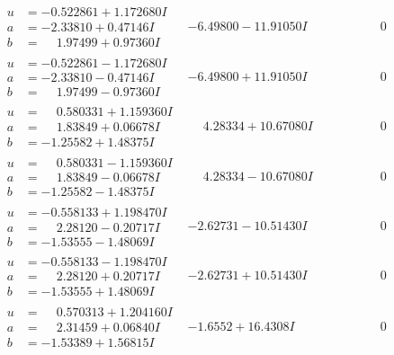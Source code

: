 \documentclass[1p]{elsarticle_modified}
\theoremstyle{definition}
\begin{document}
$$\begin{array}{c|c|c}
\begin{aligned}
u &= -0.522861 + 1.172680 I \\
a &= -2.33810 + 0.47146 I \\
b &= \phantom{-}1.97499 + 0.97360 I\end{aligned}
 & -6.49800 - 11.91050 I & \phantom{-0.000000 } 0 \\ \hline\begin{aligned}
u &= -0.522861 - 1.172680 I \\
a &= -2.33810 - 0.47146 I \\
b &= \phantom{-}1.97499 - 0.97360 I\end{aligned}
 & -6.49800 + 11.91050 I & \phantom{-0.000000 } 0 \\ \hline\begin{aligned}
u &= \phantom{-}0.580331 + 1.159360 I \\
a &= \phantom{-}1.83849 + 0.06678 I \\
b &= -1.25582 + 1.48375 I\end{aligned}
 & \phantom{-}4.28334 + 10.67080 I & \phantom{-0.000000 } 0 \\ \hline\begin{aligned}
u &= \phantom{-}0.580331 - 1.159360 I \\
a &= \phantom{-}1.83849 - 0.06678 I \\
b &= -1.25582 - 1.48375 I\end{aligned}
 & \phantom{-}4.28334 - 10.67080 I & \phantom{-0.000000 } 0 \\ \hline\begin{aligned}
u &= -0.558133 + 1.198470 I \\
a &= \phantom{-}2.28120 - 0.20717 I \\
b &= -1.53555 - 1.48069 I\end{aligned}
 & -2.62731 - 10.51430 I & \phantom{-0.000000 } 0 \\ \hline\begin{aligned}
u &= -0.558133 - 1.198470 I \\
a &= \phantom{-}2.28120 + 0.20717 I \\
b &= -1.53555 + 1.48069 I\end{aligned}
 & -2.62731 + 10.51430 I & \phantom{-0.000000 } 0 \\ \hline\begin{aligned}
u &= \phantom{-}0.570313 + 1.204160 I \\
a &= \phantom{-}2.31459 + 0.06840 I \\
b &= -1.53389 + 1.56815 I\end{aligned}
 & -1.6552 + 16.4308 I & \phantom{-0.000000 } 0 \\ \hline\begin{aligned}

\end{aligned}
\end{array}$$
\end{document}
